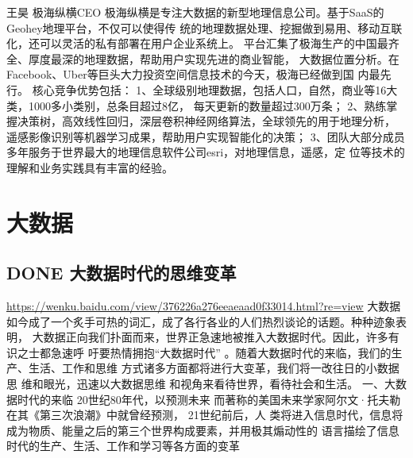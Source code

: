 \documentclass[11pt]{ctexart}
\begin{document}
{{{{王昊
极海纵横CEO
极海纵横是专注大数据的新型地理信息公司。基于SaaS的Geohey地理平台，不仅可以使得传
统的地理数据处理、挖掘做到易用、移动互联化，还可以灵活的私有部署在用户企业系统上。
平台汇集了极海生产的中国最齐全、厚度最深的地理数据，帮助用户实现先进的商业智能，
大数据位置分析。在Facebook、Uber等巨头大力投资空间信息技术的今天，极海已经做到国
内最先行。
核心竞争优势包括：
1、全球级别地理数据，包括人口，自然，商业等16大类，1000多小类别，总条目超过8亿，
每天更新的数量超过300万条；
2、熟练掌握决策树，高效线性回归，深层卷积神经网络算法，全球领先的用于地理分析，
遥感影像识别等机器学习成果，帮助用户实现智能化的决策；
3、团队大部分成员多年服务于世界最大的地理信息软件公司esri，对地理信息，遥感，定
位等技术的理解和业务实践具有丰富的经验。

\section{大数据}
\label{sec:orgccf22fa}
\subsection{{\bfseries\sffamily DONE} 大数据时代的思维变革}
\label{sec:org7c4a47b}
\url{https://wenku.baidu.com/view/376226a276eeaeaad0f33014.html?re=view}
大数据如今成了一个炙手可热的词汇，成了各行各业的人们热烈谈论的话题。种种迹象表明，
大数据正向我们扑面而来，世界正急速地被推入大数据时代。因此，许多有识之士都急速呼
吁要热情拥抱“大数据时代” 。随着大数据时代的来临，我们的生产、生活、工作和思维
方式诸多方面都将进行大变革，我们将一改往日的小数据思 维和眼光，迅速以大数据思维
和视角来看待世界，看待社会和生活。 一、大数据时代的来临 20世纪80年代，以预测未来
而著称的美国未来学家阿尔文·托夫勒在其《第三次浪潮》中就曾经预测， 21世纪前后，人
类将进入信息时代，信息将成为物质、能量之后的第三个世界构成要素，并用极其煽动性的
语言描绘了信息时代的生产、生活、工作和学习等各方面的变革

}}}}
\end{document}
